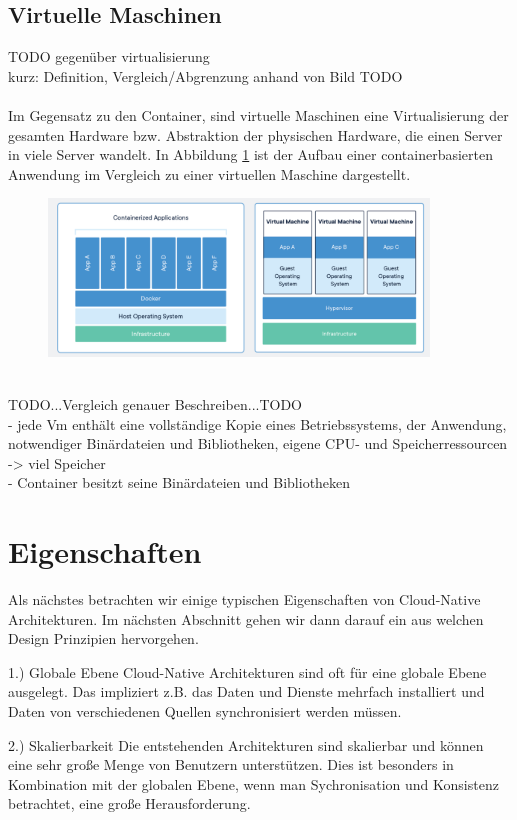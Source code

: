 \subsection{Virtuelle Maschinen}
TODO gegenüber virtualisierung\\
kurz: Definition, Vergleich/Abgrenzung anhand von Bild TODO\\
\\
Im Gegensatz zu den Container, sind virtuelle Maschinen eine Virtualisierung der gesamten Hardware bzw. Abstraktion der physischen Hardware, die einen Server in viele Server wandelt. In Abbildung \ref{vm} ist der Aufbau einer containerbasierten Anwendung im Vergleich zu einer virtuellen Maschine dargestellt.
\begin{figure}[bth] 
	\centering
	\includegraphics[width=0.9\textwidth]{Graphics/containerVsVm.png}
	\caption{}
	\label{vm}
\end{figure}\\
TODO...Vergleich genauer Beschreiben...TODO\\
- jede Vm enthält eine vollständige Kopie eines Betriebssystems, der Anwendung, notwendiger Binärdateien und Bibliotheken, eigene CPU- und Speicherressourcen -> viel Speicher\\
- Container besitzt seine Binärdateien und Bibliotheken\\

\section{Eigenschaften}
Als nächstes betrachten wir einige typischen Eigenschaften von Cloud-Native Architekturen. Im nächsten Abschnitt gehen wir dann darauf ein aus welchen Design Prinzipien hervorgehen.

1.) Globale Ebene
Cloud-Native Architekturen sind oft für eine globale Ebene ausgelegt. Das impliziert z.B. das Daten und Dienste mehrfach installiert und Daten von verschiedenen Quellen synchronisiert werden müssen.

2.) Skalierbarkeit
Die entstehenden Architekturen sind skalierbar und können eine sehr große Menge von Benutzern unterstützen. Dies ist besonders in Kombination mit der globalen Ebene, wenn man Sychronisation und Konsistenz betrachtet, eine große Herausforderung.

